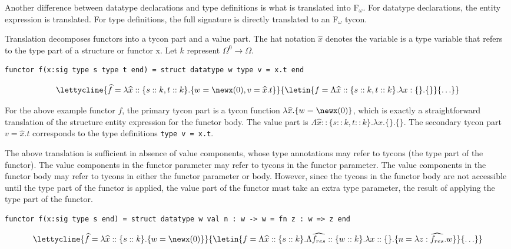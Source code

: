 Another difference between datatype declarations and type definitions
is what is translated into F$_\omega$. For datatype declarations, the
entity expression is translated. For type definitions, the full
signature is directly translated to an F$_\omega$ tycon. 

Translation decomposes functors into a tycon part and a value
part. The hat notation $\widehat{x}$ denotes the variable is a type
variable that refers to the type part of a structure or functor x. Let
$k$ represent $\Omega^0 \to \Omega$. 

\begin{lstlisting}
functor f(x:sig type s type t end) = struct datatype w type v = x.t end
\end{lstlisting}
 
\[\lettycline{\widehat{f}=\lambda \widehat{x}::\{s::k,t::k\}.\{w =
  \newx(0), v=\widehat{x}.t \}}
{\letin{f = \Lambda\widehat{x}::\{s::k, 
t:: k
    \}.\lambda x:\{\}.\{\}}
 {\ldots}}
\]

For the above example functor $f$, the primary tycon part is a tycon
function $\lambda \widehat{x}
. \{w = \newx(0) \}$, which is exactly a straightforward
translation of the structure entity expression for the functor
body. The value part is $\Lambda\widehat{x}::\{s::k, 
t :: k \}.\lambda x.\{\}.\{\}$. The
secondary tycon part $v = \widehat{x}.t$ corresponds to the type definitions
\lstinline{type v = x.t}.

The above translation is sufficient in absence of value components,
whose type annotations may refer to tycons (the type part of the
functor). The value components in the functor parameter may refer to
tycons in the functor parameter. The value components in the functor
body may refer to tycons in either the functor parameter or
body. However, since the tycons in the functor body are not accessible
until the type part of the functor is applied, the value part of the
functor must take an extra type parameter, the result of applying the
type part of the functor. 

\begin{lstlisting}
functor f(x:sig type s end) = struct datatype w val n : w -> w = fn z : w => z end
\end{lstlisting}

\[\lettycline{\widehat{f}=\lambda\widehat{x}::\{s::k\}.\{ w = \newx(0) \}}
  {\letin{f = \Lambda \widehat{x}::\{s::k\}.\Lambda
      \widehat{f_{res}}::\{ w :: k \} . \lambda x::\{\}.\{n = \lambda z:\widehat{f_{res}}.w\}
    }{\ldots}}
\]

